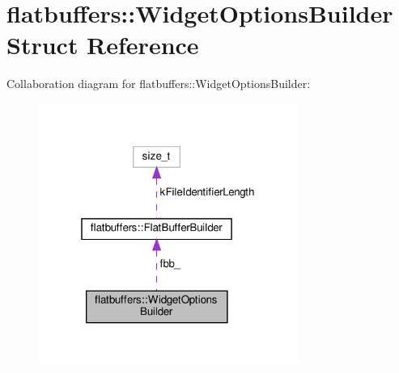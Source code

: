 \hypertarget{structflatbuffers_1_1WidgetOptionsBuilder}{}\section{flatbuffers\+:\+:Widget\+Options\+Builder Struct Reference}
\label{structflatbuffers_1_1WidgetOptionsBuilder}


Collaboration diagram for flatbuffers\+:\+:Widget\+Options\+Builder\+:
\nopagebreak
\begin{figure}[H]
\begin{center}
\leavevmode
\includegraphics[width=241pt]{structflatbuffers_1_1WidgetOptionsBuilder__coll__graph}
\end{center}
\end{figure}
